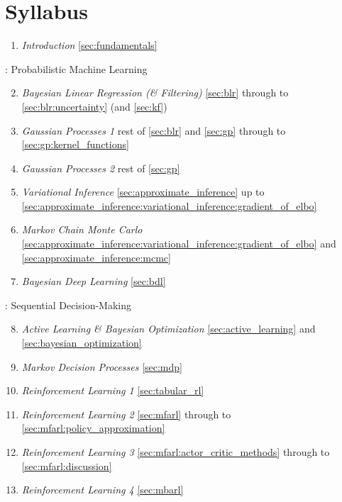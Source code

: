 \chapter{Syllabus}

\begin{fullwidth}
  \setlength{\parindent}{0pt}
  \begin{enumerate}
    \item \emph{Introduction} \quad \cref{sec:fundamentals}
  \end{enumerate}

  : Probabilistic Machine Learning
  \begin{enumerate}
    \setcounter{enumi}{1}
    \item \emph{Bayesian Linear Regression (\& Filtering)} \quad \cref{sec:blr} through to \cref{sec:blr:uncertainty} (and \cref{sec:kf})
    \item \emph{Gaussian Processes 1} \quad rest of \cref{sec:blr} and \cref{sec:gp} through to \cref{sec:gp:kernel_functions}
    \item \emph{Gaussian Processes 2} \quad rest of \cref{sec:gp}
    \item \emph{Variational Inference} \quad \cref{sec:approximate_inference} up to \cref{sec:approximate_inference:variational_inference:gradient_of_elbo}
    \item \emph{Markov Chain Monte Carlo} \quad \cref{sec:approximate_inference:variational_inference:gradient_of_elbo} and \cref{sec:approximate_inference:mcmc}
    \item \emph{Bayesian Deep Learning} \quad \cref{sec:bdl}
  \end{enumerate}\vspace{0.7em}

  : Sequential Decision-Making
  \begin{enumerate}
    \setcounter{enumi}{7}
    \item \emph{Active Learning \& Bayesian Optimization} \quad \cref{sec:active_learning} and \cref{sec:bayesian_optimization}
    \item \emph{Markov Decision Processes} \quad \cref{sec:mdp}
    \item \emph{Reinforcement Learning 1} \quad \cref{sec:tabular_rl}
    \item \emph{Reinforcement Learning 2} \quad \cref{sec:mfarl} through to \cref{sec:mfarl:policy_approximation}
    \item \emph{Reinforcement Learning 3} \quad \cref{sec:mfarl:actor_critic_methods} through to \cref{sec:mfarl:discussion}
    \item \emph{Reinforcement Learning 4} \quad \cref{sec:mbarl}
  \end{enumerate}
\end{fullwidth}
